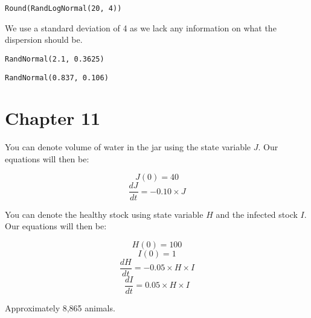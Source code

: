 \documentclass[]{memoir}
\begin{document}
\lstinline!Round(RandLogNormal(20, 4))!

We use a standard deviation of 4 as we lack any information on what the
dispersion should be.


\lstinline!RandNormal(2.1, 0.3625)!


\lstinline!RandNormal(0.837, 0.106)!

\section{Chapter 11}


You can denote volume of water in the jar using the state variable $J$.
Our equations will then be:

\[ J(0) = 40 \] \[ \frac{dJ}{dt} = -0.10 \times J\]


You can denote the healthy stock using state variable $H$ and the
infected stock $I$. Our equations will then be:

\[ H(0) = 100 \] \[ I(0) = 1 \]
\[ \frac{dH}{dt} = -0.05 \times H \times I \]
\[ \frac{dI}{dt} = 0.05 \times H \times I \]


Approximately 8,865 animals.
\end{document}
